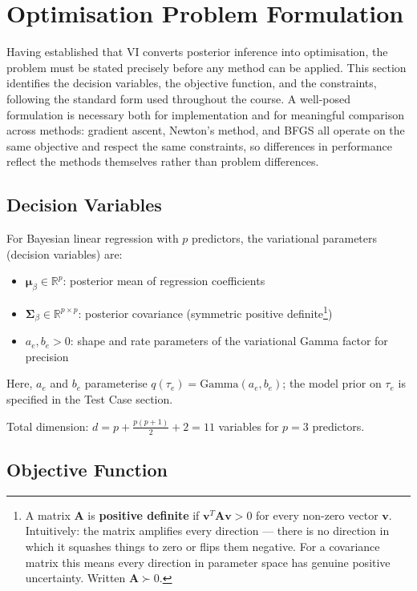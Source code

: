 \documentclass[11pt]{article}
\newcommand{\R}{\mathbb{R}}
\begin{document}
\section*{Optimisation Problem Formulation}

Having established that VI converts posterior inference into optimisation, the problem must be stated precisely before any method can be applied. This section identifies the decision variables, the objective function, and the constraints, following the standard form used throughout the course. A well-posed formulation is necessary both for implementation and for meaningful comparison across methods: gradient ascent, Newton's method, and BFGS all operate on the same objective and respect the same constraints, so differences in performance reflect the methods themselves rather than problem differences.

\subsection*{Decision Variables}

For Bayesian linear regression with $p$ predictors, the variational parameters (decision variables) are:
\begin{itemize}
\item $\bm{\mu}_\beta \in \R^p$: posterior mean of regression coefficients
\item $\bm{\Sigma}_\beta \in \R^{p \times p}$: posterior covariance (symmetric positive definite\footnote{A matrix $\bm{A}$ is \textbf{positive definite} 
if $\bm{v}^T\bm{A}\bm{v} > 0$ for every non-zero vector $\bm{v}$. Intuitively: the matrix amplifies every 
direction --- there is no direction in which it squashes things to zero or flips them negative. For a
 covariance matrix this means every direction in parameter space has genuine positive uncertainty. 
 Written $\bm{A} \succ 0$.})
\item $a_e, b_e > 0$: shape and rate parameters of the variational Gamma factor for precision
\end{itemize}

Here, $a_e$ and $b_e$ parameterise $q(\tau_e)=\mathrm{Gamma}(a_e,b_e)$; the model prior on $\tau_e$ is specified in the Test Case section.

Total dimension: $d = p + \frac{p(p+1)}{2} + 2 = 11$ variables for $p=3$ predictors.

\subsection*{Objective Function}
\end{document}
